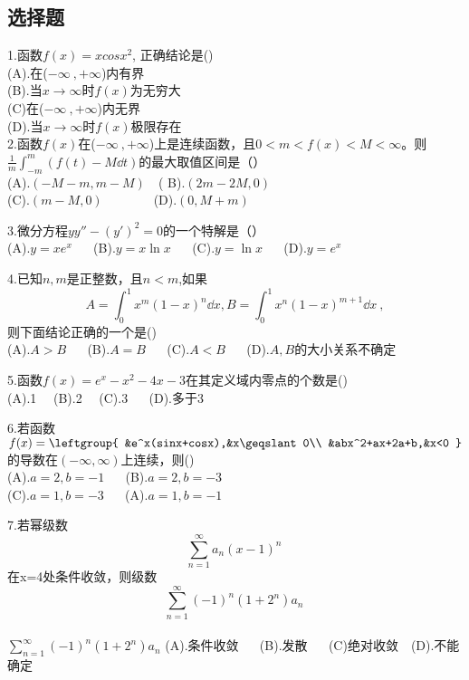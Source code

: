 
\begin{issues}
\issueDraft
\end{issues}


\subsection{选择题}
1.函数$f(x)=xcosx^2$, 正确结论是()\\
(A).在($-\infty~,+\infty$)内有界\\
(B).当$x\to\infty$时$f(x)$为无穷大\\
(C)在($-\infty~,+\infty$)内无界\\
(D).当$x\to\infty$时$f(x)$极限存在\\

2.函数$f(x)$在($-\infty~,+\infty$)上是连续函数，且$0<m<f(x)<M<\infty$。则
$ \frac{1}{m} \int_{-m}^{m}(f(t)-M \dd{t})$的最大取值区间是（）\\
(A).$(-M-m,m-M) \quad$( B).$ (2m-2M,0)$\\ (C).$(m-M,0)\qquad \qquad $(D).$(0,M+m)$

3.微分方程$y y''-(y')^2=0$的一个特解是（）\\
(A).$y=xe^x$ $\quad$ (B).$y=x\ln x$ $\quad$ (C).$y=\ln x$  $\quad$ (D).$y=e^x$

4.已知$n,m$是正整数，且$n<m$,如果
\begin{equation}
A=\int_{0}^{1} x^m(1-x)^n \dd{x},B=\int_{0}^{1}x^n(1-x)^{m+1} \dd{x}~,
\end{equation}则下面结论正确的一个是()\\
(A).$A>B$ $\quad$ (B).$A=B$ $\quad$ (C).$A<B$ $\quad$ (D).$A,B$的大小关系不确定

5.函数$f(x)=e^x-x^2-4x-3$在其定义域内零点的个数是()\\
(A).1 $\quad$(B).2 $\quad$(C).3 $\quad$ (D).多于3

6.若函数$f(x)=\leftgroup{
    &e^x(sinx+cosx),&x\geqslant0\\
    &abx^2+ax+2a+b,&x<0
    }$
    的导数在$(-\infty,\infty)$上连续，则()\\
    (A).$a=2,b=-1$   $\quad$  (B).$a=2,b=-3$   \\
    (C).$a=1,b=-3$   $\quad$   (A).$a=1,b=-1$   

7.若幂级数\begin{equation}
\sum_{n=1}^\infty a_n(x-1)^n ~
\end{equation}在x=4处条件收敛，则级数
\begin{equation}
\sum_{n=1}^\infty (-1)^n(1+2^n)a_n~
\end{equation}\\
$\displaystyle \sum_{n=1}^\infty (-1)^n(1+2^n)a_n $
(A).条件收敛 $\quad$ (B).发散 $\quad$ (C)绝对收敛$\quad$(D).不能确定

